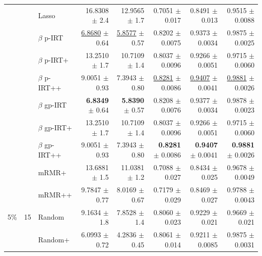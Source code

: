 \begin{longtable}{llp{}rrrrr}
 &  & Lasso & 16.8308 {\scriptsize $\pm$ 2.4} & 12.9565 {\scriptsize $\pm$ 1.7} & 0.7051 {\scriptsize $\pm$ 0.017} & 0.8491 {\scriptsize $\pm$ 0.013} & 0.9515 {\scriptsize $\pm$ 0.0088} \\
 &  & $\beta$ p-IRT & \underline{6.8680} {\scriptsize $\pm$ 0.64} & \underline{5.8577} {\scriptsize $\pm$ 0.57} & 0.8202 {\scriptsize $\pm$ 0.0075} & 0.9373 {\scriptsize $\pm$ 0.0034} & 0.9875 {\scriptsize $\pm$ 0.0025} \\
 &  & $\beta$ p-IRT+ & 13.2510 {\scriptsize $\pm$ 1.7} & 10.7109 {\scriptsize $\pm$ 1.4} & 0.8037 {\scriptsize $\pm$ 0.0096} & 0.9266 {\scriptsize $\pm$ 0.0051} & 0.9715 {\scriptsize $\pm$ 0.0060} \\
 &  & $\beta$ p-IRT++ & 9.0051 {\scriptsize $\pm$ 0.93} & 7.3943 {\scriptsize $\pm$ 0.80} & \underline{0.8281} {\scriptsize $\pm$ 0.0086} & \underline{0.9407} {\scriptsize $\pm$ 0.0041} & \underline{0.9881} {\scriptsize $\pm$ 0.0026} \\
 &  & $\beta$ gp-IRT & \textbf{6.8349} {\scriptsize $\pm$ 0.64} & \textbf{5.8390} {\scriptsize $\pm$ 0.57} & 0.8208 {\scriptsize $\pm$ 0.0076} & 0.9377 {\scriptsize $\pm$ 0.0034} & 0.9878 {\scriptsize $\pm$ 0.0023} \\
 &  & $\beta$ gp-IRT+ & 13.2510 {\scriptsize $\pm$ 1.7} & 10.7109 {\scriptsize $\pm$ 1.4} & 0.8037 {\scriptsize $\pm$ 0.0096} & 0.9266 {\scriptsize $\pm$ 0.0051} & 0.9715 {\scriptsize $\pm$ 0.0060} \\
 &  & $\beta$ gp-IRT++ & 9.0051 {\scriptsize $\pm$ 0.93} & 7.3943 {\scriptsize $\pm$ 0.80} & \textbf{0.8281} {\scriptsize $\pm$ 0.0086} & \textbf{0.9407} {\scriptsize $\pm$ 0.0041} & \textbf{0.9881} {\scriptsize $\pm$ 0.0026} \\
 &  & mRMR+ & 13.6881 {\scriptsize $\pm$ 1.5} & 11.0381 {\scriptsize $\pm$ 1.2} & 0.7088 {\scriptsize $\pm$ 0.027} & 0.8434 {\scriptsize $\pm$ 0.025} & 0.9678 {\scriptsize $\pm$ 0.0049} \\
 &  & mRMR++ & 9.7847 {\scriptsize $\pm$ 0.77} & 8.0169 {\scriptsize $\pm$ 0.67} & 0.7179 {\scriptsize $\pm$ 0.029} & 0.8469 {\scriptsize $\pm$ 0.027} & 0.9788 {\scriptsize $\pm$ 0.0043} \\
\midrule
5\% & 15 & Random & 9.1634 {\scriptsize $\pm$ 1.8} & 7.8528 {\scriptsize $\pm$ 1.4} & 0.8060 {\scriptsize $\pm$ 0.023} & 0.9229 {\scriptsize $\pm$ 0.021} & 0.9669 {\scriptsize $\pm$ 0.021} \\
 &  & Random+ & 6.0993 {\scriptsize $\pm$ 0.72} & 4.2836 {\scriptsize $\pm$ 0.45} & 0.8061 {\scriptsize $\pm$ 0.014} & 0.9211 {\scriptsize $\pm$ 0.0085} & 0.9875 {\scriptsize $\pm$ 0.0031} \\

\end{longtable}
